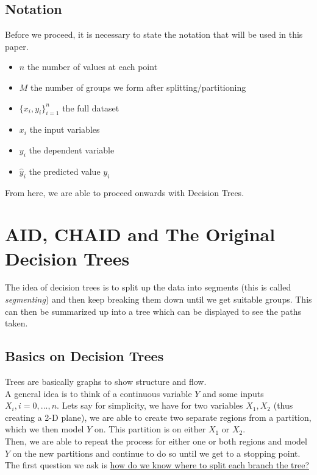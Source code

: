 \documentclass[11pt,a4paper]{report}
\begin{document}
\section{Notation}
Before we proceed, it is necessary to state the notation that will be used in this paper.
\begin{itemize}
    \item $n$ the number of values at each point
    
    \item $M$ the number of groups we form after splitting/partitioning
    
    \item $\{x_{i},y_{i}\}_{i=1}^{n}$ the full dataset
    
    \item $x_{i}$ the input variables
    
    \item $y_{i}$ the dependent variable
    
    \item $\hat{y}_{i}$ the predicted value $y_{i}$

\end{itemize}
From here, we are able to proceed onwards with Decision Trees.


\chapter{AID, CHAID and The Original Decision Trees}
The idea of decision trees is to split up the data into segments (this is called \textit{segmenting}) and then keep breaking them down until we get suitable groups. This can then be summarized up into a tree which can be displayed to see the paths taken.

\section{Basics on Decision Trees}
Trees are basically graphs to show structure and flow.\\
A general idea is to think of a continuous variable $Y$ and some inputs $X_i ,  i = 0,...,n$. Lets say for simplicity, we have for two variables $X_1, X_2$ (thus creating a 2-D plane), we are able to create two separate regions from a partition, which we then model $Y$ on. This partition is on either $X_1$ or $X_2$. \\
Then, we are able to repeat the process for either one or both regions and model $Y$ on the new partitions and continue to do so until we get to a stopping point.
\\
The first question we ask is \underline{how do we know where to split each branch the tree?}
\end{document}
